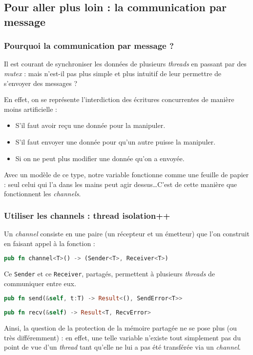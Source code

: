 \subsection{Pour aller plus loin : la communication par message}
\begin{frame}
  \frametitle{Pourquoi la communication par message ?}
  Il est courant de synchroniser les données de plusieurs \textit{threads} en passant par des \textit{mutex} : mais n'est-il pas plus simple et plus intuitif de leur permettre de s'envoyer des messages ?

En effet, on se représente l'interdiction des écritures concurrentes de manière moins artificielle :
\begin{itemize}
\item  S'il faut avoir reçu une donnée pour la manipuler.
\item  S'il faut envoyer une donnée pour qu'un autre puisse la manipuler.
\item  Si on ne peut plus modifier une donnée qu'on a envoyée.
\end{itemize}

Avec un modèle de ce type, notre variable fonctionne comme une feuille de papier : seul celui qui l'a dans les mains peut agir dessus\dots C'est de cette manière que fonctionnent les \textit{channels}.
\end{frame}

\begin{frame}[fragile]
  \frametitle{Utiliser les channels : thread isolation++}
  Un \textit{channel} consiste en une paire (un récepteur et un émetteur) que l'on construit en faisant appel à la fonction :
  \begin{lstlisting}[language=rust]
pub fn channel<T>() -> (Sender<T>, Receiver<T>)
  \end{lstlisting}
  Ce \texttt{Sender} et ce \texttt{Receiver}, partagés, permettent à plusieurs \textit{threads} de communiquer entre eux.
  \begin{lstlisting}[language=rust]
pub fn send(&self, t:T) -> Result<(), SendError<T>>
  \end{lstlisting}
  \begin{lstlisting}[language=rust]
pub fn recv(&self) -> Result<T, RecvError>
  \end{lstlisting}

Ainsi, la question de la protection de la mémoire partagée ne se pose plus (ou très différemment) : en effet, une telle variable n'existe tout simplement pas du point de vue d'un \textit{thread} tant qu'elle ne lui a pas été transférée via un \textit{channel}.
\end{frame}

